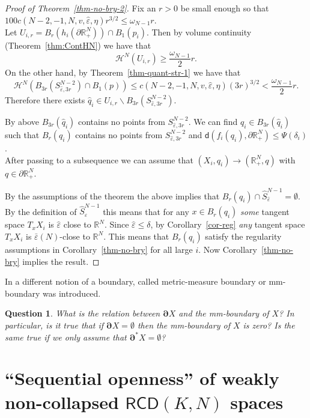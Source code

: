 \documentclass[a4paper]{amsart}
\newcounter{assu}
\theoremstyle{plain}
\newtheorem{question}[lemma]{Question}
\theoremstyle{definition}
\numberwithin{equation}{section}
\newcommand{\R}{\mathbb{R}}
\newcommand{\RCD}{\mathsf{RCD}}
\newcommand{\sfd}{\mathsf d}
\newcommand{\cH}{\mathcal{H}}
\newcommand{\eps}{\varepsilon}
\newcommand{\heps}{\hat\varepsilon}
\newcommand{\beps}{\bar \varepsilon}
\newcommand{\bRCD}{\boldsymbol\partial}
\begin{document}
{{\begin{proof}[Proof of Theorem~\ref{thm-no-bry-2}]
Fix an $r>0$ be small enough so that $100c(N-2,-1,N,v,\hat\eps,\eta)r^{3/2}\le \omega_{N-1}r$.
\\Let $U_{i,r}=B_r(h_i(\partial \R^N_+))\cap B_1(p_i)$. Then by volume continuity (Theorem~\ref{thm:ContHN}) we have that 
\[
\cH^{N}( U_{i,r})\ge \frac{\omega_{N-1}}{2}r.
\]
On the other hand, by Theorem~\ref{thm-quant-str-1} we have that
\[
\cH^{N} \left( B_{3r}(S^{N-2}_{\hat\eps,3r})\cap B_1(p)\right)\le c(N-2,-1,N,v,\hat\eps,\eta)(3r)^{3/2}<\frac{\omega_{N-1}}{2}r.
\]
Therefore there exists $\hat q_i\in U_{i,r}\backslash B_{3r}(S^{N-2}_{\hat\eps,3r})$.


By above $B_{3r}(\hat q_i)$ contains no points from $S^{N-2}_{\heps,3r}$. We can find $q_i\in B_{3r}(\hat q_i)$ such that  $B_r(q_i)$ contains no points from $S^{N-2}_{\heps,3r}$ and $\sfd(f_i(q_i), \partial \R^N_+)\le \Psi(\delta_i)$.
\\After passing to a subsequence we can assume that $(X_i,q_i)\to (\R^N_+,q)$ with $q\in \partial \R^N_+$.


By the assumptions of the theorem the above implies that $B_r(q_i)\cap \hat S^{N-1}_{\hat \eps}=\emptyset$.
By the definition of $\hat S^{N-1}_\eps$ this means that for any $x\in B_r(q_i)$ \emph{some} tangent space $T_xX_i$ is $\hat \eps$ close to $\R^N$. Since $\hat \eps\le\delta$, by Corollary~\ref{cor-reg} \emph{any} tangent space $T_xX_i$ is $\beps(N)$-close to $\R^N$. This means that $B_r(q_i)$ satisfy the regularity assumptions in Corollary~\ref{thm-no-bry} for all large $i$. Now Corollary~\ref{thm-no-bry} implies the result.


\end{proof}


In \cite{KaLytPe} a different notion of a boundary, called metric-measure boundary or mm-boundary was introduced. 
\begin{question}
What is the relation between $\bRCD X$ and the mm-boundary of $X$? In particular, is it true that if  $\bRCD X=\emptyset$ then the mm-boundary of $X$ is zero? Is the same true if we only assume that $\bRCD^*X=\emptyset$?
\end{question}





\section{``Sequential openness'' of weakly non-collapsed $\RCD(K,N)$ spaces}\label{Sec:SeqOpenNCRCD}

}}
\end{document}
